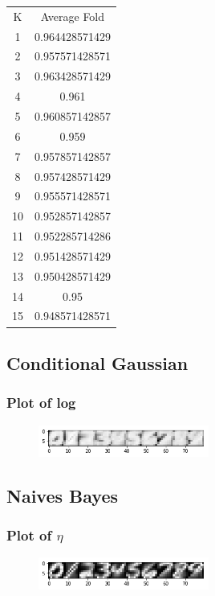 \documentclass[letterpaper]{article}
\begin{document}
\begin{center}
\begin{tabular}{ |c|c| } 
 \hline
K & Average Fold \\ 
1  &  0.964428571429\\
2  &  0.957571428571\\
3  &  0.963428571429\\
4  &  0.961\\
5  &  0.960857142857\\
6  &  0.959\\
7  &  0.957857142857\\
8  &  0.957428571429\\
9  &  0.955571428571\\
10  &  0.952857142857\\
11  &  0.952285714286\\
12  &  0.951428571429\\
13  &  0.950428571429\\
14  &  0.95\\
15  &  0.948571428571\\
 \hline
\end{tabular}
\end{center}


\subsection{Conditional Gaussian}
\subsubsection{Plot of log}
\begin{figure}[H]
\centering
\includegraphics[width=0.5\textwidth]{log_sigma_k.png}
\caption{\label{}}
\end{figure}



\subsection{Naives Bayes}
\subsubsection{Plot of $\eta$}
\begin{figure}[H]
\centering
\includegraphics[width=0.5\textwidth]{q3_eta.png}
\caption{\label{}}
\end{figure}
\end{document}
